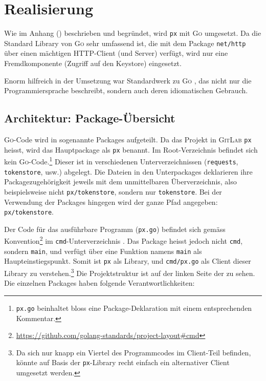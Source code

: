 \section{Realisierung}
\label{sec:Realisierung}

Wie im Anhang () beschrieben und begründet, wird \texttt{px} mit \textsc{Go} umgesetzt. Da die Standard Library von \textsc{Go} sehr umfassend ist, die mit dem Package \texttt{net/http} über einen mächtigen HTTP-Client (und Server) verfügt, wird nur eine Fremdkomponente (Zugriff auf den Keystore) eingesetzt.

Enorm hilfreich in der Umsetzung war Standardwerk zu \textsc{Go} \cite{gopl}, das nicht nur die Programmiersprache beschreibt, sondern auch deren idiomatischen Gebrauch.

\subsection{Architektur: Package-Übersicht}
\label{sec:Architektur-Package-Übersicht}

\textsc{Go}-Code wird in sogenannte Packages aufgeteilt. Da das Projekt in \textsc{GitLab} \texttt{px} heisst, wird das Hauptpackage als \texttt{px} benannt. Im Root-Verzeichnis befindet sich kein \textsc{Go}-Code.\footnote{\texttt{px.go} beinhaltet bloss eine Package-Deklaration mit einem entsprechenden Kommentar.} Dieser ist in verschiedenen Unterverzeichnissen (\texttt{requests}, \texttt{tokenstore}, usw.) abgelegt. Die Dateien in den Unterpackages deklarieren ihre Packagezugehörigkeit jeweils mit dem unmittelbaren Überverzeichnis, also beispielsweise nicht \texttt{px/tokenstore}, sondern nur \texttt{tokenstore}. Bei der Verwendung der Packages hingegen wird der ganze Pfad angegeben: \texttt{px/tokenstore}.

Der Code für das ausführbare Programm (\texttt{px.go}) befindet sich gemäss Konvention\footnote{\url{https://github.com/golang-standards/project-layout\#cmd}} im \texttt{cmd}-Unterverzeichnis \cite[S. 12]{powerful-cli-apps-in-go}. Das Package heisst jedoch nicht \texttt{cmd}, sondern \texttt{main}, und verfügt über eine Funktion namens \texttt{main} als Haupteinstiegspunkt. Somit ist \texttt{px} als Library, und \texttt{cmd/px.go} als Client dieser Library zu verstehen.\footnote{Da sich nur knapp ein Viertel des Programmcodes im Client-Teil befinden, könnte auf Basis der \texttt{px}-Library recht einfach ein alternativer Client umgesetzt werden.} Die Projektstruktur ist auf der linken Seite der  zu sehen. Die einzelnen Packages haben folgende Verantwortlichkeiten:

